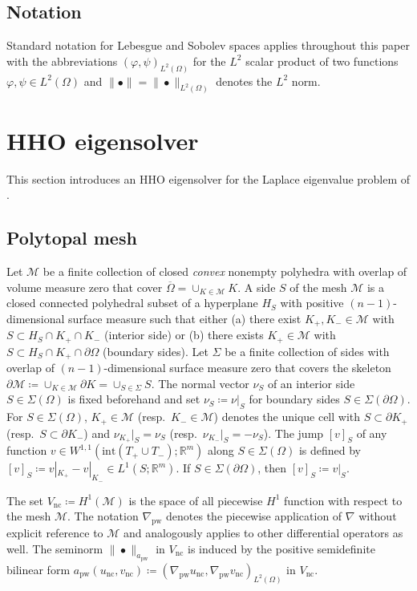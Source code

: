 \documentclass[a4paper]{amsart}
\numberwithin{equation}{section}
\newcommand{\R}{\mathbb{R}}
\newcommand{\Mcal}{\mathcal{M}}
\newcommand{\pw}{\mathrm{pw}}
\theoremstyle{remark}
\theoremstyle{definition}
\theoremstyle{assumptionnoperiod}
\begin{document}
\subsection{Notation} Standard notation for Lebesgue and Sobolev spaces applies throughout this paper with the abbreviations $(\varphi,\psi)_{L^2(\Omega)}$ for the $L^2$ scalar product of two functions $\varphi, \psi \in L^2(\Omega)$ and $\|\bullet\| = \|\bullet\|_{L^2(\Omega)}$ denotes the $L^2$ norm.

\section{HHO eigensolver}\label{sec:laplace}
This section introduces an HHO eigensolver for the Laplace eigenvalue problem of .

\subsection{Polytopal mesh}
Let $\mathcal{M}$ be a finite collection of closed \emph{convex} nonempty polyhedra with overlap of volume measure zero that cover $\overline{\Omega} = \cup_{K \in \mathcal{M}} K$.
A side $S$ of the mesh $\mathcal{M}$ is a closed connected polyhedral subset of a hyperplane $H_S$ with positive $(n-1)$-dimensional surface measure such that either (a) there exist $K_+,K_- \in \mathcal{M}$ with $S \subset H_S \cap K_+ \cap K_-$ (interior side) or (b) there exists $K_+ \in \mathcal{M}$ with $S \subset H_S \cap K_+ \cap \partial \Omega$ (boundary sides).
Let $\Sigma$ be a finite collection of sides with overlap of $(n-1)$-dimensional surface measure zero that covers the skeleton $\partial \mathcal{M} \coloneqq \cup_{K \in \mathcal{M}} \partial K = \cup_{S \in \Sigma} S$.
The normal vector $\nu_S$ of an interior side $S \in \Sigma(\Omega)$ is fixed beforehand and set $\nu_S \coloneqq \nu|_S$ for boundary sides $S \in \Sigma(\partial \Omega)$.
For $S \in \Sigma(\Omega)$, $K_+ \in \mathcal{M}$ (resp.~$K_- \in \mathcal{M}$) denotes the unique cell with $S \subset \partial K_{+}$ (resp.~$S \subset \partial K_-$) and $\nu_{K_+}|_S = \nu_S$ (resp.~$\nu_{K_-}|_S = -\nu_S$).
The jump $[v]_S$ of any function $v \in W^{1,1}(\mathrm{int}(T_+ \cup T_-);\R^m)$ along $S \in \Sigma(\Omega)$ is defined by $[v]_S \coloneqq v|_{K_+} - v|_{K_-} \in L^1(S;\R^m)$.
If $S \in \Sigma(\partial \Omega)$, then $[v]_S \coloneqq v|_S$.

The set $V_\mathrm{nc} \coloneqq H^1(\Mcal)$ is the space of all piecewise $H^1$ function with respect to the mesh $\Mcal$.
The notation $\nabla_\pw$ denotes the piecewise application of $\nabla$ without explicit reference to $\Mcal$ and analogously applies to other differential operators as well.
The seminorm $\|\bullet\|_{a_\pw}$ in $V_\mathrm{nc}$ is induced by the positive semidefinite bilinear form $a_\pw(u_\mathrm{nc}, v_\mathrm{nc}) \coloneqq (\nabla_\pw u_\mathrm{nc}, \nabla_\pw v_\mathrm{nc})_{L^2(\Omega)}$ in $V_\mathrm{nc}$.
\end{document}
